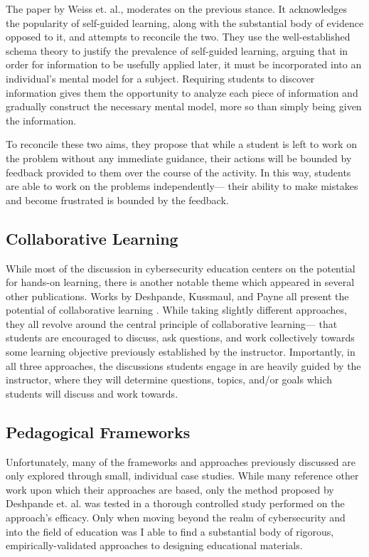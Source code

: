     The paper by Weiss et. al., moderates on the previous stance. %
It acknowledges the popularity of self-guided learning, along with the substantial body of evidence opposed to it, and attempts to reconcile the two. %
They use the well-established schema theory to justify the prevalence of self-guided learning, arguing that in order for information to be usefully applied later, it must be incorporated into an individual's mental model for a subject. 
    Requiring students to discover information gives them the opportunity to analyze each piece of information and gradually construct the necessary mental model, more so than simply being given the information. 

    To reconcile these two aims, they propose that while a student is left to work on the problem without any immediate guidance, their actions will be bounded by feedback provided to them over the course of the activity. 
    In this way, students are able to work on the problems independently---%
their ability to make mistakes and become frustrated is bounded by the feedback. 

\subsection{Collaborative Learning}

    While most of the discussion in cybersecurity education centers on the potential for hands-on learning, there is another notable theme which appeared in several other publications. %
Works by Deshpande, Kussmaul, and Payne all present the potential of collaborative learning \cite{P-Deshpande,C-Kussmaul,B-Payne}. %
While taking slightly different approaches, they all revolve around the central principle of collaborative learning---%
that students are encouraged to discuss, ask questions, and work collectively towards some learning objective previously established by the instructor. 
    Importantly, in all three approaches, the discussions students engage in are heavily guided by the instructor, where they will determine questions, topics, and/or goals which students will discuss and work towards. 

\subsection{Pedagogical Frameworks}

    Unfortunately, many of the frameworks and approaches previously discussed are only explored through small, individual case studies. %
While many reference other work upon which their approaches are based, only the method proposed by Deshpande et. al. was tested in a thorough controlled study performed on the approach's efficacy. %
Only when moving beyond the realm of cybersecurity and into the field of education was I able to find a substantial body of rigorous, empirically-validated approaches to designing educational materials. 

